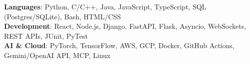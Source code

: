 \begin{itemize}[leftmargin=0.15in, label={}]
    \small{\item{
     \textbf{Languages}{: Python, C/C++, Java, JavaScript, TypeScript, SQL (Postgres/SQLite), Bash, HTML/CSS} \\
     \textbf{Development}{: React, Node.js, Django, FastAPI, Flask, Asyncio, WebSockets, REST APIs, JUnit, PyTest} \\
     \textbf{AI \& Cloud}{: PyTorch, TensorFlow, AWS, GCP, Docker, GitHub Actions, Gemini/OpenAI API, MCP, Linux}
    }}
\end{itemize}
